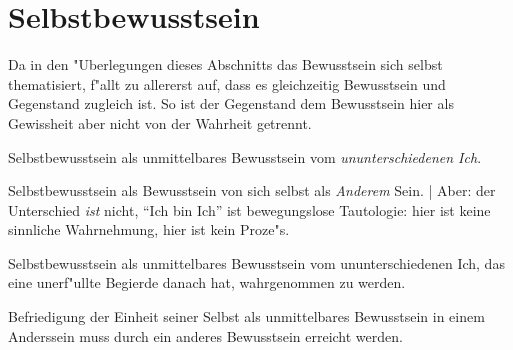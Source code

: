 \documentclass[a4paper, justified]{tufte-handout}
\begin{document}
\section{Selbstbewusstsein}\label{sec:page-layout}

Da in den "Uberlegungen dieses Abschnitts das Bewusstsein sich selbst thematisiert, f"allt zu allererst auf, dass es gleichzeitig Bewusstsein und Gegenstand zugleich ist. So ist der Gegenstand dem Bewusstsein hier als Gewissheit aber nicht von der Wahrheit getrennt.

\begin{description}[leftmargin=!,labelwidth=\widthof{\bfseries Neg. d. Neg}]
  \item[Meinen] Selbstbewusstsein als unmittelbares Bewusstsein vom \emph{ununterschiedenen Ich}.
  \item[Negation] Selbstbewusstsein als Bewusstsein von sich selbst als \emph{Anderem} Sein. | Aber: der Unterschied \emph{ist} nicht, "`Ich bin Ich"' ist bewegungslose Tautologie: hier ist keine sinnliche Wahrnehmung, hier ist kein Proze"s.
  \item[Neg. d. Neg.] Selbstbewusstsein als unmittelbares Bewusstsein vom ununterschiedenen Ich, das eine unerf"ullte Begierde danach hat, wahrgenommen zu werden.
  \item[Erkenntnis] Befriedigung der Einheit seiner Selbst als unmittelbares Bewusstsein in einem Anderssein muss durch ein anderes Bewusstsein erreicht werden.
\end{description}

%
\end{document}
